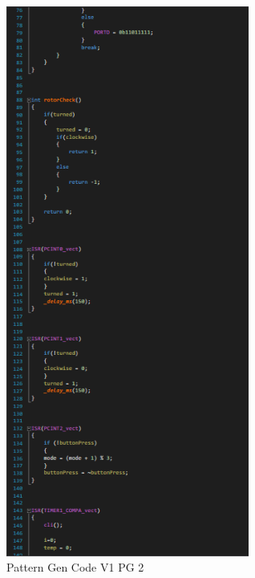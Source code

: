 \documentclass[12pt]{article}
\begin{document}
        \begin{figure}[htp]
            \centering
            \includegraphics[width=8cm]{Pattern Gen Code V1 PG 2.png}
            \caption{Pattern Gen Code V1 PG 2}
        \end{figure}

        \newpage
\end{document}
